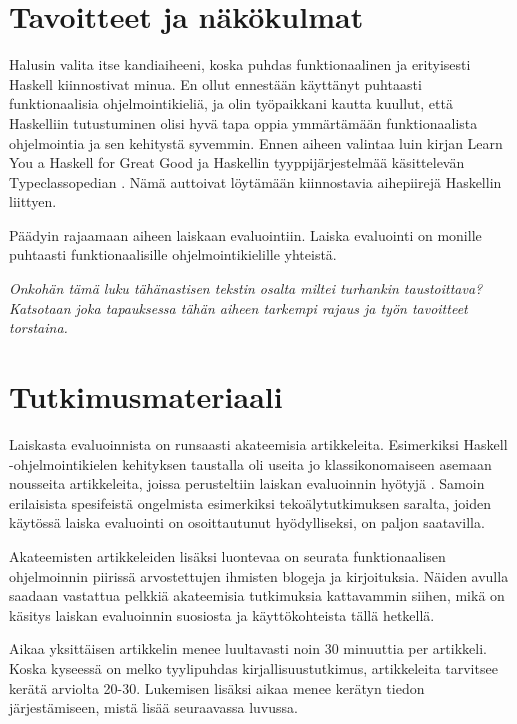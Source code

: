 \documentclass[12pt,a4paper,finnish,oneside]{article}
\begin{document}
\section{Tavoitteet ja näkökulmat}

Halusin valita itse kandiaiheeni, koska puhdas funktionaalinen ja erityisesti Haskell kiinnostivat minua. En ollut ennestään käyttänyt puhtaasti funktionaalisia ohjelmointikieliä, ja olin työpaikkani kautta kuullut, että Haskelliin tutustuminen olisi hyvä tapa oppia ymmärtämään funktionaalista ohjelmointia ja sen kehitystä syvemmin. Ennen aiheen valintaa luin kirjan Learn You a Haskell for Great Good \cite{lipovaca2011learn} ja Haskellin tyyppijärjestelmää käsittelevän Typeclassopedian \cite{yorgey2009typeclassopedia}. Nämä auttoivat löytämään kiinnostavia aihepiirejä Haskellin liittyen.

Päädyin rajaamaan aiheen laiskaan evaluointiin. Laiska evaluointi on monille puhtaasti funktionaalisille ohjelmointikielille yhteistä.

\emph{Onkohän tämä luku tähänastisen tekstin osalta miltei turhankin taustoittava? Katsotaan joka tapauksessa tähän aiheen tarkempi rajaus ja työn tavoitteet torstaina.}

\section{Tutkimusmateriaali}

\begin{sloppypar}
Laiskasta evaluoinnista on runsaasti akateemisia artikkeleita. Esimerkiksi Haskell -ohjelmointikielen kehityksen taustalla oli useita jo klassikonomaiseen asemaan nousseita artikkeleita, joissa perusteltiin laiskan evaluoinnin hyötyjä \cite{hudak2007history}. Samoin erilaisista spesifeistä ongelmista esimerkiksi tekoälytutkimuksen saralta, joiden käytössä laiska evaluointi on osoittautunut hyödylliseksi, on paljon saatavilla.
\end{sloppypar}

Akateemisten artikkeleiden lisäksi luontevaa on seurata funktionaalisen ohjelmoinnin piirissä arvostettujen ihmisten blogeja ja kirjoituksia. Näiden avulla saadaan vastattua pelkkiä akateemisia tutkimuksia kattavammin siihen, mikä on käsitys laiskan evaluoinnin suosiosta ja käyttökohteista tällä hetkellä.

Aikaa yksittäisen artikkelin menee luultavasti noin 30 minuuttia per artikkeli. Koska kyseessä on melko tyylipuhdas kirjallisuustutkimus, artikkeleita tarvitsee kerätä arviolta 20-30. Lukemisen lisäksi aikaa menee kerätyn tiedon järjestämiseen, mistä lisää seuraavassa luvussa.
\end{document}
